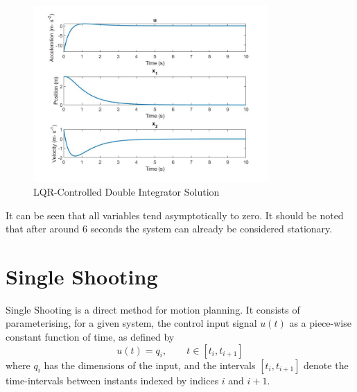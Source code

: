 
\begin{figure}[h!]
\centering
\includegraphics[width=0.8\textwidth]{Images/solution_lqr.jpg}
\caption{\acs{LQR}-Controlled Double Integrator Solution}
\label{fig:solution_lqr}
\end{figure}

\par It can be seen that all variables tend asymptotically to zero. It should be noted that after around 6 seconds the system can already be considered stationary.



\section{Single Shooting}
\label{sec:singleshooting}

\par Single Shooting is a direct method for motion planning. It consists of parameterising, for a given system, the control input signal $u(t)$ as a piece-wise constant function of time, as defined by 
\begin{equation}
    \label{eq:single_shooting}
    u(t) = q_i, \qquad t\in [t_i,t_{i+1}]
\end{equation}
where $q_i$ has the dimensions of the input, and the intervals $[t_i,t_{i+1}]$ denote the time-intervals between instants indexed by indices $i$ and $i+1$.

